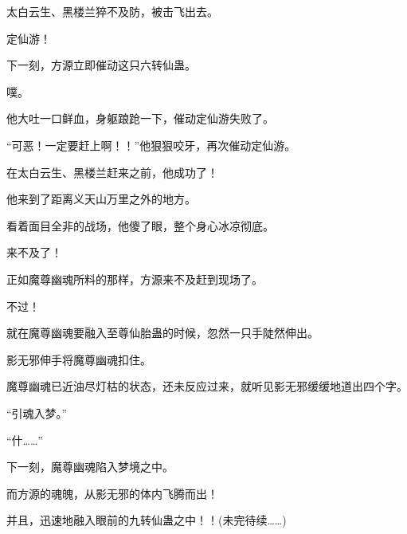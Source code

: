 \begin{this_body}
太白云生、黑楼兰猝不及防，被击飞出去。

定仙游！

下一刻，方源立即催动这只六转仙蛊。

噗。

他大吐一口鲜血，身躯踉跄一下，催动定仙游失败了。

“可恶！一定要赶上啊！！”他狠狠咬牙，再次催动定仙游。

在太白云生、黑楼兰赶来之前，他成功了！

他来到了距离义天山万里之外的地方。

看着面目全非的战场，他傻了眼，整个身心冰凉彻底。

来不及了！

正如魔尊幽魂所料的那样，方源来不及赶到现场了。

不过！

就在魔尊幽魂要融入至尊仙胎蛊的时候，忽然一只手陡然伸出。

影无邪伸手将魔尊幽魂扣住。

魔尊幽魂已近油尽灯枯的状态，还未反应过来，就听见影无邪缓缓地道出四个字。

“引魂入梦。”

“什……”

下一刻，魔尊幽魂陷入梦境之中。

而方源的魂魄，从影无邪的体内飞腾而出！

并且，迅速地融入眼前的九转仙蛊之中！！(未完待续……)

\end{this_body}


